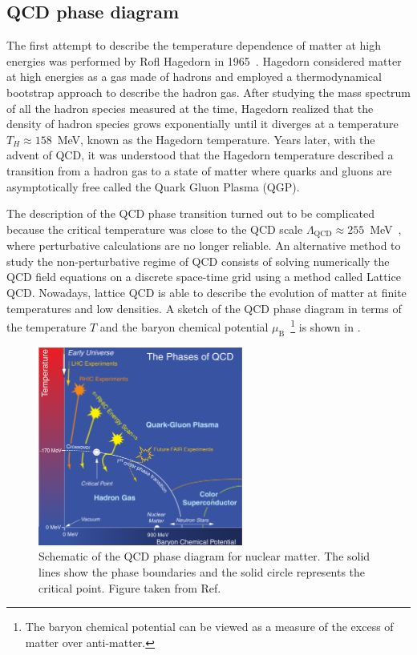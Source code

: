 \subsection{QCD phase diagram}

The first attempt to describe the temperature dependence of matter at high energies was performed by Rofl Hagedorn in 1965~\cite{Hagedorn1965}. Hagedorn considered matter at high energies as a gas made of hadrons and employed a thermodynamical bootstrap approach to describe the hadron gas. After studying the mass spectrum of all the hadron species measured at the time, Hagedorn realized that the density of hadron species grows exponentially until it diverges at a temperature $T_{H} \approx 158$~MeV, known as the Hagedorn temperature. Years later, with the advent of QCD, it was understood that the Hagedorn temperature described a transition from a hadron gas to a state of matter where quarks and gluons are asymptotically free called the Quark Gluon Plasma (QGP).

The description of the QCD phase transition turned out to be complicated because the critical temperature was close to the QCD scale $\Lambda_{\mathrm{QCD}} \approx 255$~MeV~\cite{LambdaQCD}, where perturbative calculations are no longer reliable. An alternative method to study the non-perturbative regime of QCD consists of solving numerically the QCD field equations on a discrete space-time grid using a method called Lattice QCD. Nowadays, lattice QCD is able to describe the evolution of matter at finite temperatures and low densities. A sketch of the QCD phase diagram in terms of the temperature $T$ and the baryon chemical potential $\mu_{\mathrm{B}}$~\footnote{The baryon chemical potential can be viewed as a measure of the excess of matter over anti-matter.} is shown in .

\begin{figure}[!htbp]
 \begin{center}
  \includegraphics[width=0.6\textwidth]{Figures/Introduction/StandardModel/QCDPhaseDiagram.png}
 \end{center}
\caption{Schematic of the QCD phase diagram for nuclear matter. The solid lines show the phase boundaries and the solid circle represents the critical point. Figure taken from Ref.~\cite{QCDPhaseDiagram}}
 \label{fig:QCDPhaseDiagram}
\end{figure}

